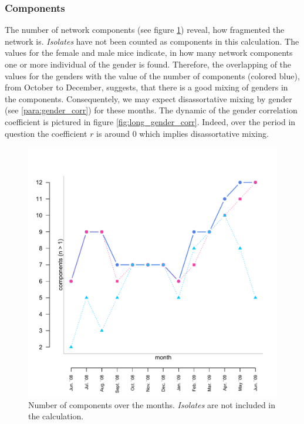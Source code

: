\subsubsection{Components}

The number of network components (see figure \ref{fig:long_comps}) reveal, how fragmented  the network is. \textit{Isolates} have not been counted as components in this calculation. The values for the female and male mice indicate, in how many network components one or more individual of the gender is found. Therefore, the overlapping of the values for the genders with the value of the number of components (colored blue), from October to December, suggests, that there is a good mixing of genders in the components. Consequentely, we may expect disassortative mixing by gender (see \ref{para:gender_corr}) for these months. The dynamic of the gender correlation coefficient is pictured in figure \ref{fig:long_gender_corr}. Indeed, over the period in question the coefficient $r$ is around 0 which implies disassortative mixing.

\begin{figure}[htpb]
\begin{center}
  \includegraphics[width=.6\textwidth]{assets/pdf/long_comps.pdf}
  \caption[Number of components over the months]{Number of components over the months. \textit{Isolates} are not included in the calculation.}
  \label{fig:long_comps}
\end{center}
\end{figure}


% 

